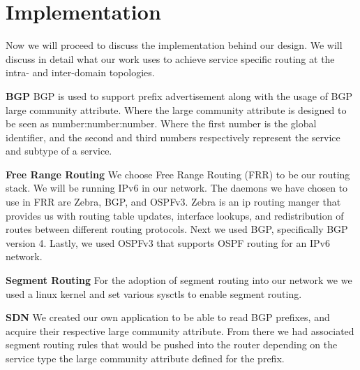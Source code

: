 

\section{Implementation}
\label{sec:implementation}

Now we will proceed to discuss the implementation behind our design.
We will discuss in detail what our work uses to achieve service specific
routing at the intra- and inter-domain topologies. 

\textbf{BGP} BGP is used to support prefix advertisement along with the usage
of BGP large community attribute. Where the large community attribute is designed
to be seen as number:number:number. Where the first number is the global identifier,
and the second and third numbers respectively represent the service and subtype of a service. 

\textbf{Free Range Routing} We choose Free Range Routing (FRR) to be our
routing stack. We will be running IPv6 in our network. The daemons we have chosen 
to use in FRR are Zebra, BGP, and OSPFv3. Zebra is an ip routing manger that
provides us with routing table updates, interface lookups, and redistribution of routes
between different routing protocols. Next we used BGP, specifically BGP version 4. 
Lastly, we used OSPFv3 that supports OSPF routing for an IPv6 network. 

\textbf{Segment Routing} For the adoption of segment routing into our network we 
we used a linux kernel and set various sysctls to enable segment routing.~\cite{SRV6}

\textbf{SDN} We created our own application to be able to read BGP prefixes, and acquire their 
respective large community attribute. From there we had associated segment routing rules 
that would be pushed into the router depending on the service type the large community 
attribute defined for the prefix.


